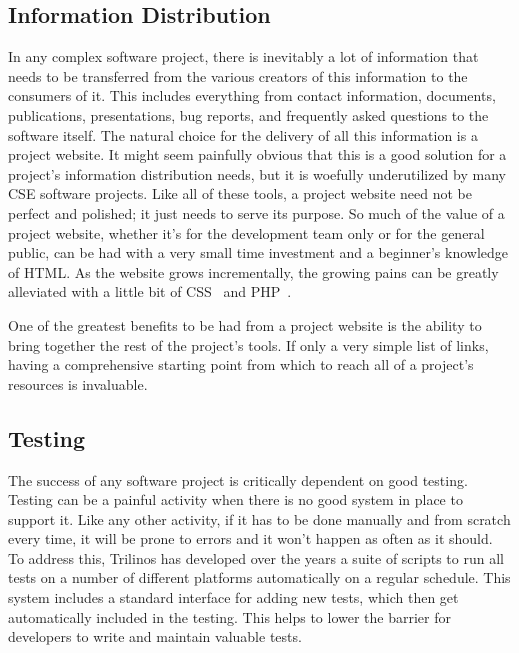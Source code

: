\documentclass{doublecol}
\begin{document}
\subsection{Information Distribution}


In any complex software project, there is inevitably a lot of
information that needs to be transferred from the various creators
of this information to the consumers of it.  This includes
everything from contact information, documents, publications,
presentations, bug reports, and frequently asked questions to the
software itself.  The natural choice for the delivery of all this
information is a project website.  It might seem painfully obvious
that this is a good solution for a project's information
distribution needs, but it is woefully underutilized by many CSE
software projects.  Like all of these tools, a project website need
not be perfect and polished; it just needs to
serve its purpose.  So much of the value of a project website,
whether it's for the development team only or for the general
public, can be had with a very small time investment and a
beginner's knowledge of HTML.  As the website grows incrementally,
the growing pains can be greatly alleviated with a little bit of
CSS~\cite{CSS} and PHP~\cite{PHP}.

One of the greatest benefits to be had from a project website is the
ability to bring together the rest of the project's tools.  If only
a very simple list of links, having a comprehensive starting point
from which to reach all of a project's resources is invaluable.

\subsection{Testing}


The success of any software project is critically dependent on good
testing. Testing can be a painful activity when there is no good
system in place to support it.  Like any other activity, if it has
to be done manually and from scratch every time, it will be prone to
errors and it won't happen as often as it should.  To address this,
Trilinos has developed over the years a suite of scripts to run all
tests on a number of different platforms automatically on a regular
schedule.  This system includes a standard interface for adding new
tests, which then get automatically included in the testing.  This
helps to lower the barrier for developers to write and maintain
valuable tests.
\end{document}
